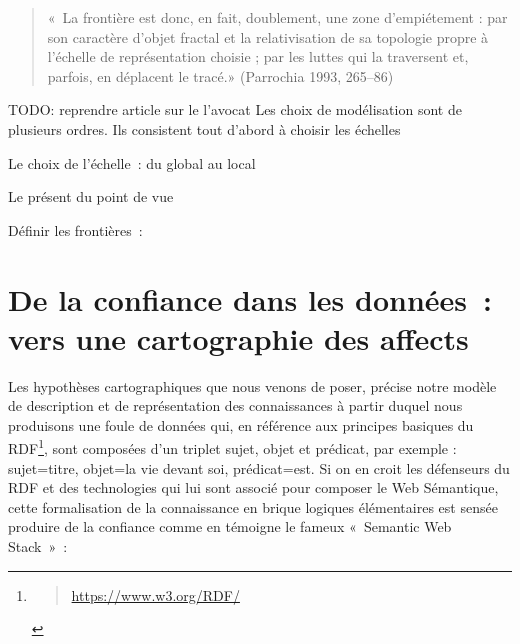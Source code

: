 \documentclass[
  letterpaper,
  DIV=11,
  numbers=noendperiod]{scrreprt}
\begin{document}
\begin{quote}
«~La frontière est donc, en fait, doublement, une zone d'empiétement :
par son caractère d'objet fractal et la relativisation de sa topologie
propre à l'échelle de représentation choisie ; par les luttes qui la
traversent et, parfois, en déplacent le tracé.» (Parrochia 1993,
265--86)
\end{quote}

TODO: reprendre article sur le l'avocat Les choix de modélisation sont
de plusieurs ordres. Ils consistent tout d'abord à choisir les échelles

Le choix de l'échelle~: du global au local

Le présent du point de vue

Définir les frontières~:

\hypertarget{de-la-confiance-dans-les-donnuxe9es-vers-une-cartographie-des-affects}{%
\section{De la confiance dans les données~: vers une cartographie des
affects}\label{de-la-confiance-dans-les-donnuxe9es-vers-une-cartographie-des-affects}}

Les hypothèses cartographiques que nous venons de poser, précise notre
modèle de description et de représentation des connaissances à partir
duquel nous produisons une foule de données qui, en référence aux
principes basiques du RDF\footnote{\begin{quote}
  \url{https://www.w3.org/RDF/}
  \end{quote}}, sont composées d'un triplet sujet, objet et prédicat,
par exemple : sujet=titre, objet=la vie devant soi, prédicat=est. Si on
en croit les défenseurs du RDF et des technologies qui lui sont associé
pour composer le Web Sémantique, cette formalisation de la connaissance
en brique logiques élémentaires est sensée produire de la confiance
comme en témoigne le fameux «~Semantic Web Stack~»~:
\end{document}

